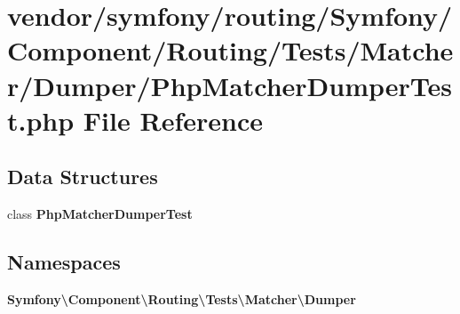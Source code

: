 \section{vendor/symfony/routing/\+Symfony/\+Component/\+Routing/\+Tests/\+Matcher/\+Dumper/\+Php\+Matcher\+Dumper\+Test.php File Reference}
\label{_php_matcher_dumper_test_8php}
\subsection*{Data Structures}
\begin{DoxyCompactItemize}
\item 
class {\bf Php\+Matcher\+Dumper\+Test}
\end{DoxyCompactItemize}
\subsection*{Namespaces}
\begin{DoxyCompactItemize}
\item 
 {\bf Symfony\textbackslash{}\+Component\textbackslash{}\+Routing\textbackslash{}\+Tests\textbackslash{}\+Matcher\textbackslash{}\+Dumper}
\end{DoxyCompactItemize}
